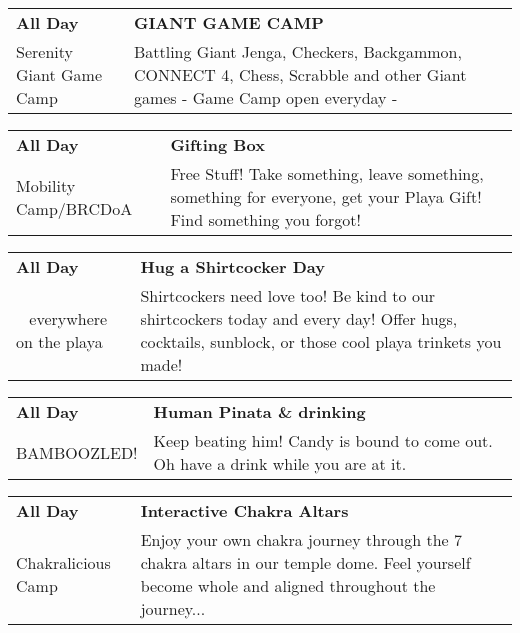 \begin{tabular}{ p{1in} p{2.2in} }
    \textbf{All Day} & \textbf{GIANT GAME CAMP} \\
    Serenity Giant Game Camp \newline  & Battling Giant Jenga, Checkers, Backgammon, CONNECT 4, Chess, Scrabble and other Giant games - Game Camp open everyday - \\
    \hline 
\end{tabular}
    
\begin{tabular}{ p{1in} p{2.2in} }
    \textbf{All Day} & \textbf{Gifting Box} \\
    Mobility Camp/BRCDoA \newline  & Free Stuff! Take something, leave something, something for everyone, get your Playa Gift! Find something you forgot! \\
    \hline 
\end{tabular}
    
\begin{tabular}{ p{1in} p{2.2in} }
    \textbf{All Day} & \textbf{Hug a Shirtcocker Day} \\
    ~ \newline everywhere on the playa & Shirtcockers need love too! Be kind to our shirtcockers today and every day! Offer hugs, cocktails, sunblock, or those cool playa trinkets you made! \\
    \hline 
\end{tabular}
    
\begin{tabular}{ p{1in} p{2.2in} }
    \textbf{All Day} & \textbf{Human Pinata \& drinking} \\
    BAMBOOZLED! \newline  & Keep beating him! Candy is bound to come out. Oh have a drink while you are at it. \\
    \hline 
\end{tabular}
    
\begin{tabular}{ p{1in} p{2.2in} }
    \textbf{All Day} & \textbf{Interactive Chakra Altars} \\
    Chakralicious Camp \newline  & Enjoy your own chakra journey through the 7 chakra altars in our temple dome. Feel yourself become whole and aligned throughout the journey... \\
    \hline 
\end{tabular}
    
